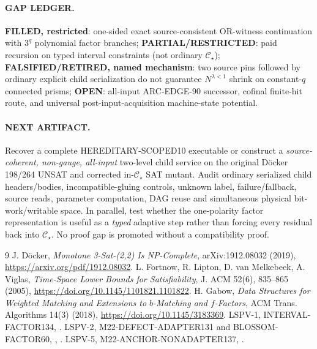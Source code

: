 \documentclass[11pt]{article}
\newcommand{\CS}{\mathcal C_{\star}}
\begin{document}
\paragraph{GAP LEDGER.}
\textbf{FILLED, restricted}: one-sided exact source-consistent OR-witness continuation with $3^q$ polynomial factor branches; \textbf{PARTIAL/RESTRICTED}: paid recursion on typed interval constraints (not ordinary $\CS$); \textbf{FALSIFIED/RETIRED, named mechanism}: two source pins followed by ordinary explicit child serialization do not guarantee $N^{\lambda<1}$ shrink on constant-$q$ connected prisms; \textbf{OPEN}: all-input ARC-EDGE-90 successor, cofinal finite-hit route, and universal post-input-acquisition machine-state potential.

\paragraph{NEXT ARTIFACT.}
Recover a complete HEREDITARY-SCOPED10 executable or construct a \emph{source-coherent, non-gauge, all-input} two-level child service on the original D\"ocker 198/264 UNSAT and corrected in-$\CS$ SAT mutant. Audit ordinary serialized child headers/bodies, incompatible-gluing controls, unknown label, failure/fallback, source reads, parameter computation, DAG reuse and simultaneous physical bit-work/writable space. In parallel, test whether the one-polarity factor representation is useful as a \emph{typed} adaptive step rather than forcing every residual back into $\CS$. No proof gap is promoted without a compatibility proof.

\begin{thebibliography}{9}
 J. D\"ocker, \emph{Monotone 3-Sat-(2,2) Is NP-Complete}, arXiv:1912.08032 (2019), \url{https://arxiv.org/pdf/1912.08032}.
 L. Fortnow, R. Lipton, D. van Melkebeek, A. Viglas, \emph{Time-Space Lower Bounds for Satisfiability}, J. ACM 52(6), 835--865 (2005), \url{https://doi.org/10.1145/1101821.1101822}.
 H. Gabow, \emph{Data Structures for Weighted Matching and Extensions to $b$-Matching and $f$-Factors}, ACM Trans. Algorithms 14(3) (2018), \url{https://doi.org/10.1145/3183369}.
 LSPV-1, INTERVAL-FACTOR134, .
 LSPV-2, M22-DEFECT-ADAPTER131 and BLOSSOM-FACTOR60, , .
 LSPV-5, M22-ANCHOR-NONADAPTER137, .
\end{thebibliography}
\end{document}
